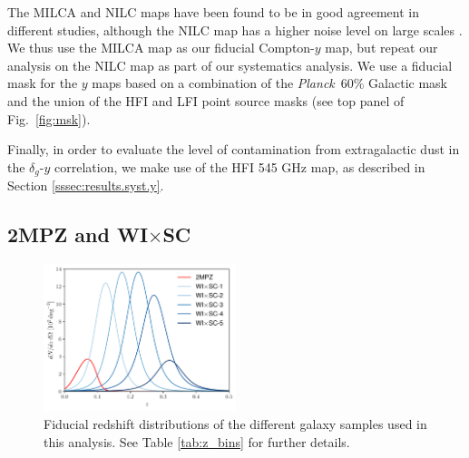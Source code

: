 \documentclass[useAMS,usenatbib]{mn2e}
\newcommand{\wisc}{WI$\times$SC}
\def\planck{{\it Planck\/}}
\begin{document}
    The MILCA and NILC maps have been found to be in good agreement in different studies, although the NILC map has a higher noise level on large scales \citep{2016A&A...594A..22P}. We thus use the MILCA map as our fiducial Compton-$y$ map, but repeat our analysis on the NILC map as part of our systematics analysis. We use a fiducial mask for the $y$ maps based on a combination of the \planck\ 60\% Galactic mask and the union of the HFI and LFI point source masks (see top panel of Fig.\!~\ref{fig:msk}).
    
    Finally, in order to evaluate the level of contamination from extragalactic dust in the $\delta_g$-$y$ correlation, we make use of the HFI 545 GHz map, as described in Section \ref{sssec:results.syst.y}.
    
  \subsection{2MPZ and \wisc}\label{ssec:data.g1}
    \begin{figure}
      \centering
      \includegraphics[width=0.5\textwidth]{nzs.pdf}
      \caption{Fiducial redshift distributions of the different galaxy samples used in this analysis. See Table \ref{tab:z_bins} for further details.}
      \label{fig:dndz}
    \end{figure}
\end{document}
